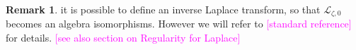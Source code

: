 \documentclass{article}
\newcommand{\singexp}[2]{\mathcal{H}L^\infty_{#1, #2}}
\newcommand{\C}{\mathbb{C}}
\newcommand{\series}[1]{\tilde{#1}}
\newcommand*{\defeq}{\mathrel{\vcenter{\baselineskip0.5ex \lineskiplimit0pt
                     \hbox{\scriptsize.}\hbox{\scriptsize.}}}%
                     =}
\newcommand{\laplace}{\mathcal{L}}
\newcommand{\borel}{\mathcal{B}}
\theoremstyle{definition}
\newtheorem{remark}[definition]{Remark}
\theoremstyle{plain}
\newtheorem{lemma}[definition]{Lemma}
\newenvironment{verify}{\color{ForestGreen}}{\color{black}}
\begin{document}
\begin{remark}
    it is possible to define an inverse Laplace transform, so that $\laplace_{\zeta,0}$ becomes an algebra isomorphisms. However we will refer to \textcolor{magenta}{[standard reference]} for details. \textcolor{magenta}{[see also section on Regularity for Laplace]}  
\end{remark}

\end{document}
